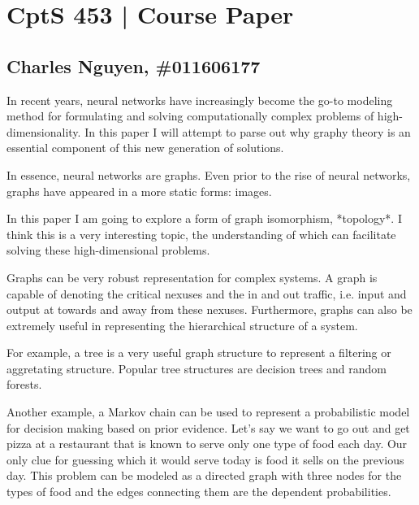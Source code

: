 \documentclass[12pt,letterpaper]{article}
\begin{document}
\section*{CptS 453 | Course Paper }
\subsection*{Charles Nguyen, \#011606177 }

In recent years, neural networks have increasingly become the go-to modeling method for formulating and solving computationally complex problems of high-dimensionality. In this paper I will attempt to parse out why graphy theory is an essential component of this new generation of solutions.

In essence, neural networks are graphs. Even prior to the rise of neural networks, graphs have appeared in a more static forms: images.

In this paper I am going to explore a form of graph isomorphism, *topology*. I think this is a very interesting topic, the understanding of which can facilitate solving these high-dimensional problems.

Graphs can be very robust representation for complex systems. A graph is capable of denoting the critical nexuses and the in and out traffic, i.e. input and output at towards and away from these nexuses. Furthermore, graphs can also be extremely useful in representing the hierarchical structure of a system.

For example, a tree is a very useful graph structure to represent a filtering or aggretating structure. Popular tree structures are decision trees and random forests.

Another example, a Markov chain can be used to represent a probabilistic model for decision making based on prior evidence. Let's say we want to go out and get pizza at a restaurant that is known to serve only one type of food each day. Our only clue for guessing which it would serve today is food it sells on the previous day. This problem can be modeled as a directed graph with three nodes for the types of food and the edges connecting them are the dependent probabilities.
\end{document}

